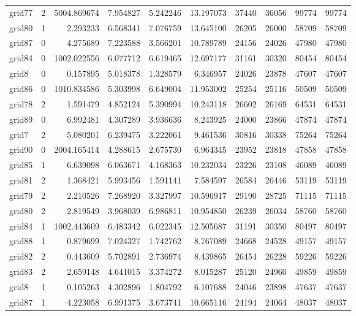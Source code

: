 \begin{longtable}{|l|r|r|r|r|r|r|r|r|r|}
grid77 & 2 & 5004.869674 & 7.954827 & 5.242246 & 13.197073 & 37440 & 36056 & 99774 & 99774 \\
grid80 & 1 & 2.293233 & 6.568341 & 7.076759 & 13.645100 & 26205 & 26000 & 58709 & 58709 \\
grid87 & 0 & 4.275689 & 7.223588 & 3.566201 & 10.789789 & 24156 & 24026 & 47980 & 47980 \\
grid84 & 0 & 1002.022556 & 6.077712 & 6.619465 & 12.697177 & 31161 & 30320 & 80454 & 80454 \\
grid8 & 0 & 0.157895 & 5.018378 & 1.328579 & 6.346957 & 24026 & 23878 & 47607 & 47607 \\
grid86 & 0 & 1010.834586 & 5.303998 & 6.649004 & 11.953002 & 25254 & 25116 & 50509 & 50509 \\
grid78 & 2 & 1.591479 & 4.852124 & 5.390994 & 10.243118 & 26602 & 26169 & 64531 & 64531 \\
grid89 & 0 & 6.992481 & 4.307289 & 3.936636 & 8.243925 & 24000 & 23866 & 47874 & 47874 \\
grid7 & 2 & 5.080201 & 6.239475 & 3.222061 & 9.461536 & 30816 & 30338 & 75264 & 75264 \\
grid90 & 0 & 2004.165414 & 4.288615 & 2.675730 & 6.964345 & 23952 & 23818 & 47858 & 47858 \\
grid85 & 1 & 6.639098 & 6.063671 & 4.168363 & 10.232034 & 23226 & 23108 & 46089 & 46089 \\
grid81 & 2 & 1.368421 & 5.993456 & 1.591141 & 7.584597 & 26584 & 26446 & 53119 & 53119 \\
grid79 & 2 & 2.210526 & 7.268920 & 3.327997 & 10.596917 & 29190 & 28725 & 71115 & 71115 \\
grid80 & 2 & 2.819549 & 3.968039 & 6.986811 & 10.954850 & 26239 & 26034 & 58760 & 58760 \\
grid84 & 1 & 1002.443609 & 6.483342 & 6.022345 & 12.505687 & 31191 & 30350 & 80497 & 80497 \\
grid88 & 1 & 0.879699 & 7.024327 & 1.742762 & 8.767089 & 24668 & 24528 & 49157 & 49157 \\
grid82 & 2 & 0.443609 & 5.702891 & 2.736974 & 8.439865 & 26454 & 26228 & 59226 & 59226 \\
grid83 & 2 & 2.659148 & 4.641015 & 3.374272 & 8.015287 & 25120 & 24960 & 49859 & 49859 \\
grid8 & 1 & 0.105263 & 4.302896 & 1.804792 & 6.107688 & 24046 & 23898 & 47637 & 47637 \\
grid87 & 1 & 4.223058 & 6.991375 & 3.673741 & 10.665116 & 24194 & 24064 & 48037 & 48037 \\

\end{longtable}

